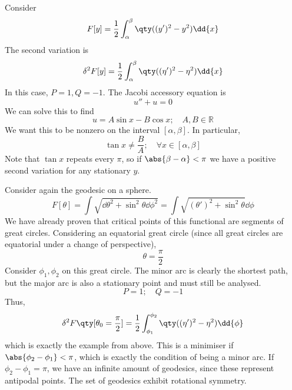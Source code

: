 \begin{example}
	Consider
	\[
		F[y] = \frac{1}{2} \int_\alpha^\beta \qty( (y')^2 - y^2 ) \dd{x}
	\]
	The second variation is
	\[
		\delta^2 F[y] = \frac{1}{2} \int_\alpha^\beta \qty( (\eta')^2 - \eta^2 ) \dd{x}
	\]
	In this case, \( P = 1, Q = -1 \).
	The Jacobi accessory equation is
	\[
		u'' + u = 0
	\]
	We can solve this to find
	\[
		u = A \sin x - B \cos x;\quad A,B \in \mathbb R
	\]
	We want this to be nonzero on the interval \( [\alpha, \beta] \).
	In particular,
	\[
		\tan x \neq \frac{B}{A};\quad \forall x \in [\alpha, \beta]
	\]
	Note that \( \tan x \) repeats every \( \pi \), so if \( \abs{\beta - \alpha} < \pi \) we have a positive second variation for any stationary \( y \).
\end{example}

\begin{example}
	Consider again the geodesic on a sphere.
	\[
		F[\theta] = \int \sqrt{\dd{\theta}^2 + \sin^2\theta \dd{\phi}^2} = \int \sqrt{(\theta')^2 + \sin^2\theta}\dd{\phi}
	\]
	We have already proven that critical points of this functional are segments of great circles.
	Considering an equatorial great circle (since all great circles are equatorial under a change of perspective),
	\[
		\theta = \frac{\pi}{2}
	\]
	Consider \( \phi_1, \phi_2 \) on this great circle.
	The minor arc is clearly the shortest path, but the major arc is also a stationary point and must still be analysed.
	\[
		P = 1;\quad Q = -1
	\]
	Thus,
	\[
		\delta^2 F\qty[\theta_0 = \frac{\pi}{2}] = \frac{1}{2} \int_{\phi_1}^{\phi_2} \qty((\eta')^2 - \eta^2) \dd{\phi}
	\]
	which is exactly the example from above.
	This is a minimiser if \( \abs{\phi_2 - \phi_1} < \pi \), which is exactly the condition of being a minor arc.
	If \( \phi_2 - \phi_1 = \pi \), we have an infinite amount of geodesics, since these represent antipodal points.
	The set of geodesics exhibit rotational symmetry.
\end{example}
